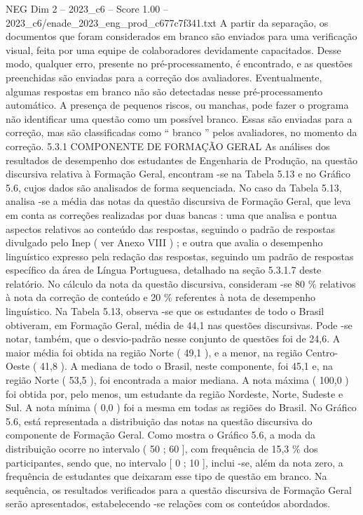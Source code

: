 \begin{textsample}{NEG Dim 2 – 2023\_c6 – Score 1.00 – 2023\_c6/enade\_2023\_eng\_prod\_c677c7f341.txt}
A partir da separação, os documentos que foram considerados em branco são enviados para uma verificação visual, feita por uma equipe de colaboradores devidamente capacitados.
Desse modo, qualquer erro, presente no pré-processamento, é encontrado, e as questões preenchidas são enviadas para a correção dos avaliadores.
Eventualmente, algumas respostas em branco não são detectadas nesse pré-processamento automático.
A presença de pequenos riscos, ou manchas, pode fazer o programa não identificar uma questão como um possível branco.
Essas são enviadas para a correção, mas são classificadas como “ branco ” pelos avaliadores, no momento da correção. 5.3.1 COMPONENTE DE FORMAÇÃO GERAL As análises dos resultados de desempenho dos estudantes de Engenharia de Produção, na questão discursiva relativa à Formação Geral, encontram -se na Tabela 5.13 e no Gráfico 5.6, cujos dados são analisados de forma sequenciada.
No caso da Tabela 5.13, analisa -se a média das notas da questão discursiva de Formação Geral, que leva em conta as correções realizadas por duas bancas : uma que analisa e pontua aspectos relativos ao conteúdo das respostas, seguindo o padrão de respostas divulgado pelo Inep ( ver Anexo VIII ) ; e outra que avalia o desempenho linguístico expresso pela redação das respostas, seguindo um padrão de respostas específico da área de Língua Portuguesa, detalhado na seção 5.3.1.7 deste relatório.
No cálculo da nota da questão discursiva, consideram -se 80 \% relativos à nota da correção de conteúdo e 20 \% referentes à nota de desempenho linguístico.
Na Tabela 5.13, observa -se que os estudantes de todo o Brasil obtiveram, em Formação Geral, média de 44,1 nas questões discursivas.
Pode -se notar, também, que o desvio-padrão nesse conjunto de questões foi de 24,6.
A maior média foi obtida na região Norte ( 49,1 ), e a menor, na região Centro-Oeste ( 41,8 ).
A mediana de todo o Brasil, neste componente, foi 45,1 e, na região Norte ( 53,5 ), foi encontrada a maior mediana.
A nota máxima ( 100,0 ) foi obtida por, pelo menos, um estudante da região Nordeste, Norte, Sudeste e Sul.
A nota mínima ( 0,0 ) foi a mesma em todas as regiões do Brasil.
No Gráfico 5.6, está representada a distribuição das notas na questão discursiva do componente de Formação Geral.
Como mostra o Gráfico 5.6, a moda da distribuição ocorre no intervalo ( 50 ; 60 ], com frequência de 15,3 \% dos participantes, sendo que, no intervalo [ 0 ; 10 ], inclui -se, além da nota zero, a frequência de estudantes que deixaram esse tipo de questão em branco.
Na sequência, os resultados verificados para a questão discursiva de Formação Geral serão apresentados, estabelecendo -se relações com os conteúdos abordados.

\end{textsample}
